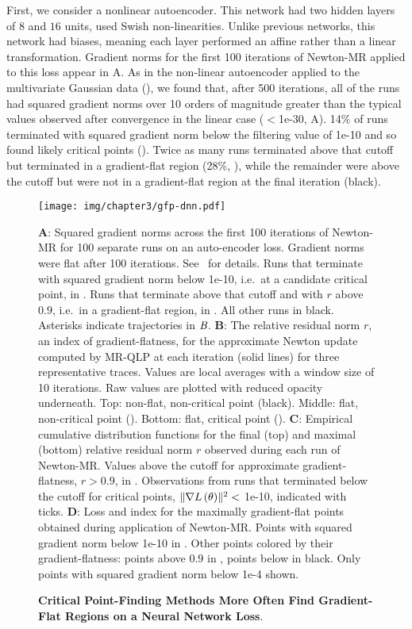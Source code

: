 \documentclass[../../thesis.tex]{subfiles}
\begin{document}
First, we consider a nonlinear autoencoder.
This network had two hidden layers of $8$ and $16$ units,
used Swish non-linearities.
Unlike previous networks, this network had biases,
meaning each layer performed an affine rather than a linear transformation.
Gradient norms for the first 100 iterations of Newton-MR
applied to this loss
appear in A.
As in the non-linear autoencoder applied to the multivariate Gaussian data
(),
we found that, after 500 iterations,
all of the runs had squared gradient norms
over 10 orders of magnitude greater than the typical
values observed after convergence in the linear case
($<$1e-30, A).
14\% of runs terminated with squared gradient norm
below the filtering value of 1e-10
and so found likely critical points
(\successcolor{}).
Twice as many runs terminated above that cutoff
but terminated in a gradient-flat region
(28\%, \failcolor{}),
while the remainder were above
the cutoff but were not in a gradient-flat region
at the final iteration
(black).

\begin{figure}[htpb]
	\begin{center}
	    \texttt{[image: img/chapter3/gfp-dnn.pdf]}
	\end{center}
	\caption{\textbf{Critical Point-Finding Methods
	More Often Find Gradient-Flat Regions
	on a Neural Network Loss}.}{%
	\textbf{A}:
	Squared gradient norms across the first 100 iterations of Newton-MR
	for 100 separate runs on an auto-encoder loss.
	Gradient norms were flat after 100 iterations.
	See~ for details.
	Runs that terminate with squared gradient norm below 1e-10,
	i.e.~at a candidate critical point, in \successcolor{}.
	Runs that terminate above that cutoff and with $r$ above $0.9$,
	i.e.~in a gradient-flat region, in \failcolor{}.
	All other runs in black.
	Asterisks indicate trajectories in $\emph{B}$.
	\textbf{B}:
	The relative residual norm $r$,
	an index of gradient-flatness,
	for the approximate Newton update
	computed by MR-QLP at each iteration
	(solid lines)
	for three representative traces.
	Values are local averages with a window size of 10 iterations.
	Raw values are plotted with reduced opacity underneath.
	Top: non-flat, non-critical point (black).
	Middle: flat, non-critical point (\failcolor{}).
	Bottom: flat, critical point (\successcolor{}).
	\textbf{C}:
	Empirical cumulative distribution functions for
	the final (top) and maximal (bottom) relative residual norm $r$ observed
	during each run of Newton-MR\@.
	Values above the cutoff for approximate gradient-flatness, $r>0.9$,
	in \failcolor{}.
	Observations from runs that terminated below the cutoff for critical points,
	$\lVert\nabla L\left(\theta\right)\rVert^2 <$ 1e-10,
	indicated with \successcolor{} ticks.
	\textbf{D}:
	Loss and index for the maximally gradient-flat points
	obtained during application of Newton-MR\@.
	Points with squared gradient norm below 1e-10 in \successcolor{}.
	Other points colored by their gradient-flatness:
	points above $0.9$ in \failcolor{}, points below in black.
	Only points with squared gradient norm below 1e-4 shown.
	}
\end{figure}
\end{document}
